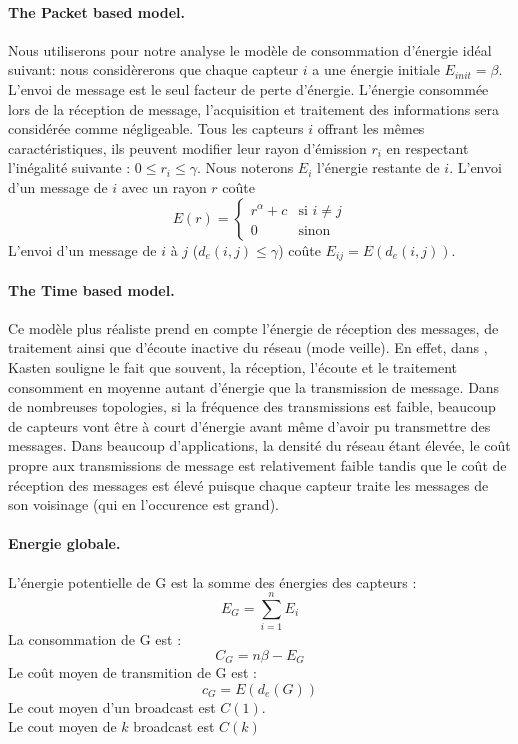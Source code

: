 \paragraph{The Packet based model.}
Nous utiliserons pour notre analyse le modèle de consommation d'énergie idéal suivant:
nous considèrerons que chaque capteur $i$ a une énergie initiale $E_{init}=\beta$.
L'envoi de message est le seul facteur de perte d'énergie. L'énergie consommée lors de la réception de message, l'acquisition et traitement des informations sera considérée comme négligeable.
Tous les capteurs $i$ offrant les mêmes caractéristiques, ils peuvent modifier leur rayon d'émission $r_i$ en respectant l'inégalité suivante : $0 \leq r_i \leq \gamma$.
Nous noterons $E_i$ l'énergie restante de $i$.
L'envoi d'un message de $i$ avec un rayon $r$ coûte $$ E(r)= \begin{cases} r^\alpha + c & \text{si }i\neq j \\ 0 & \text{sinon}  \end{cases}$$
L'envoi d'un message de $i$ à $j$ ($d_e(i,j)\leq \gamma$) coûte  $ E_{ij}=E(d_e(i,j))$.

\paragraph{The Time based model.}
Ce modèle plus réaliste prend en compte l'énergie de réception des messages, de traitement ainsi que d'écoute inactive du réseau (mode veille).
En effet, dans \cite{Kasten2001}, Kasten souligne le fait que souvent, la réception, l'écoute et le traitement consomment en moyenne autant d'énergie que la transmission de message.
Dans de nombreuses topologies, si la fréquence des transmissions est faible, beaucoup de capteurs vont être à court d'énergie avant même d'avoir pu transmettre des messages.
Dans beaucoup d'applications, la densité du réseau étant élevée, le coût propre aux transmissions de message est relativement faible tandis que le coût de réception des messages est élevé puisque chaque capteur traite les messages de son voisinage (qui en l'occurence est grand).



\paragraph{Energie globale.}
\begin{mydef}
 L'énergie potentielle de G est la somme des énergies des capteurs :$$E_G=\sum_{i=1}^n{E_i}$$
 La consommation de  G est :$$C_G=n\beta - E_G$$
 Le coût moyen de transmition de  G est :$$c_G=E(d_e(G))$$
 Le cout moyen d'un broadcast est $C(1)$.\\
 Le cout moyen de $k$ broadcast est $C(k)$
\end{mydef}


